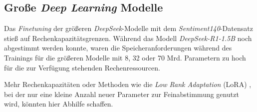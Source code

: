 \subsection{Große \textit{Deep Learning} Modelle}

Das \textit{Finetuning} der größeren \textit{DeepSeek}-Modelle mit dem \textit{Sentiment140}-Datensatz stieß auf Rechenkapazitätsgrenzen.
Während das Modell \textit{DeepSeek-R1-1.5B} noch abgestimmt werden konnte, waren die Speicheranforderungen während des Trainings für die größeren Modelle mit 8, 32 oder 70 Mrd. Parametern zu hoch für die zur Verfügung stehenden Rechenressourcen.

Mehr Rechenkapazitäten oder Methoden wie die \textit{Low Rank Adaptation} (LoRA) \cite{lora2021}, bei der nur eine kleine Anzahl neuer Parameter zur Feinabstimmung genutzt wird, könnten hier Abhilfe schaffen.
